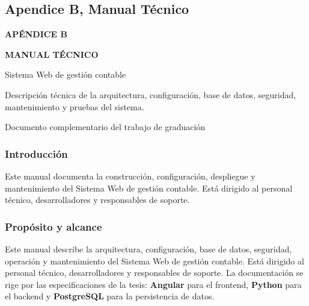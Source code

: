 \newpage

\setcounter{section}{2}
\renewcommand{\thesection}{\Alph{section}}
\renewcommand{\thesubsection}{\thesection.\arabic{subsection}}
\renewcommand{\thesubsubsection}{\thesection.\arabic{subsubsection}}
\renewcommand{\thefigure}{\thesection\arabic{figure}}
\renewcommand{\thetable}{\thesection\arabic{table}}
\setcounter{figure}{0}
\setcounter{table}{0}
\setcounter{subsection}{0}
\setcounter{subsubsection}{0}
\captionsetup{list=false}
{}
\subsection*{Apendice B, Manual Técnico}\label{ap:manual_tecnico}
\begin{center}
\vspace*{2cm}
{\Large\textbf{APÉNDICE B}}\par
\vspace{1.5cm}
{\Large\textbf{MANUAL TÉCNICO}}\par
\vspace{0.8cm}
{\large Sistema Web de gestión contable}\par
\vspace{2cm}
\begin{minipage}{0.82\textwidth}
\centering
Descripción técnica de la arquitectura, configuración, base de datos, seguridad, mantenimiento y pruebas del sistema.
\end{minipage}
\vfill
Documento complementario del trabajo de graduación\par
\end{center}

\newpage
\setlength{\parindent}{1.27cm}
\setlength{\parskip}{0pt}

\subsubsection{Introducción}
Este manual documenta la construcción, configuración, despliegue y mantenimiento del Sistema Web de gestión contable. Está dirigido al personal técnico, desarrolladores y responsables de soporte.

\subsubsection{Propósito y alcance}
Este manual describe la arquitectura, configuración, base de datos, seguridad, operación y mantenimiento del Sistema Web de gestión contable. Está dirigido al personal técnico, desarrolladores y responsables de soporte. La documentación se rige por las especificaciones de la tesis: \textbf{Angular} para el frontend, \textbf{Python} para el backend y \textbf{PostgreSQL} para la persistencia de datos.

